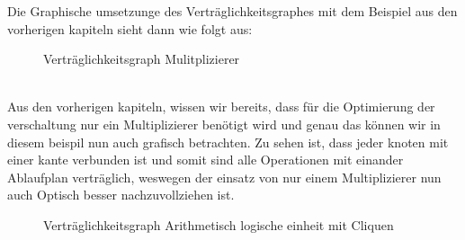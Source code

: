 \documentclass[conference]{IEEEtran}
\begin{document}
Die Graphische umsetzunge des Verträglichkeitsgraphes mit dem Beispiel aus den vorherigen kapiteln sieht dann wie folgt aus: 
\begin{figure}[h]
\caption{Verträglichkeitsgraph Mulitplizierer}
\label{fig.2}
\end{figure}\\
Aus den vorherigen kapiteln, wissen wir bereits, dass für die Optimierung der verschaltung nur ein Multiplizierer benötigt wird und genau das können wir in diesem beispil nun auch grafisch betrachten. Zu sehen ist, dass jeder knoten mit einer kante verbunden ist und somit sind alle Operationen mit einander Ablaufplan verträglich, weswegen der einsatz von nur einem Multiplizierer nun auch Optisch besser nachzuvollziehen ist.\\
\begin{figure}[h]
\caption{Verträglichkeitsgraph Arithmetisch logische einheit mit Cliquen}
\label{fig.4}
\end{figure}
\end{document}
